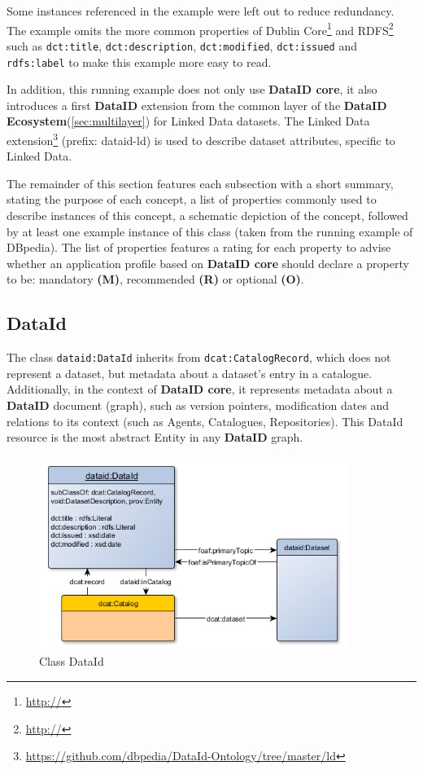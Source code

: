 \documentclass[a4paper,english,twoside,BCOR1.5cm,headsepline,DIV12,appendixprefix,final,12pt]{scrbook}
\newcommand{\ecosystem}{{\ttfamily\bfseries DataID Ecosystem}\xspace}
\newcommand{\dataid}{{\ttfamily\bfseries DataID}\xspace}
\newcommand{\core}{{\ttfamily\bfseries DataID core}\xspace}
\newcommand{\prop}[1]{{{\texttt{#1}}}}
\newcommand\footnoteurl[1]{\footnote{\scriptsize\url{#1}}}
\begin{document}
Some instances referenced in the example were left out to reduce redundancy. The example omits the more common properties of Dublin Core\footnoteurl{http://} and RDFS\footnoteurl{http://} such as \prop{dct:title}, \prop{dct:description}, \prop{dct:modified}, \prop{dct:issued} and \prop{rdfs:label} to make this example more easy to read. 

In addition, this running example does not only use \core, it also introduces a first \dataid extension from the common layer of the \ecosystem (\cref{sec:multilayer}) for Linked Data datasets. The Linked Data extension\footnoteurl{https://github.com/dbpedia/DataId-Ontology/tree/master/ld} (prefix: dataid-ld) is used to describe dataset attributes, specific to Linked Data.

The remainder of this section features each subsection with a short summary, stating the purpose of each concept, a list of properties commonly used to describe instances of this concept, a schematic depiction of the concept, followed by at least one example instance of this class (taken from the running example of DBpedia). The list of properties features a rating for each property to advise whether an application profile based on \core should declare a property to be: mandatory \textbf{(M)}, recommended \textbf{(R)} or optional \textbf{(O)}.


\subsection{DataId} 
\label{sec:coredataid}
The class \prop{dataid:DataId} inherits from \prop{dcat:CatalogRecord}, which does not represent a dataset, but metadata about a dataset's entry in a catalogue. Additionally, in the context of \core, it represents metadata about a \dataid document (graph), such as version pointers, modification dates and relations to its context (such as Agents, Catalogues, Repositories). This DataId resource is the most abstract Entity in any \dataid graph. 

\begin{figure}[!htbp]
\centering
  \includegraphics[width=10cm]{images/ClassDataId.png}
  \caption{Class DataId}
  \label{fig:example}
\end{figure}
\end{document}
